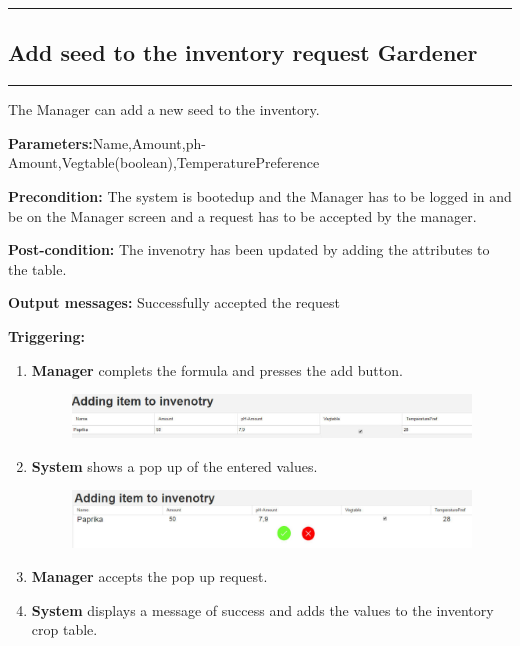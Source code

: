 \hfill
\vspace{0.5cm}
\hrule

\break

\subsection{Add seed to the inventory request Gardener}

\hrule
\hfill
\vspace{0.5cm}

\label{operation:Add a diffrent seed request Gardener}

The Manager can add a new seed to the inventory.
\begin{description}
\item
\textbf{Parameters:}Name,Amount,ph-Amount,Vegtable(boolean),TemperaturePreference
\item \textbf{Precondition:} The system is bootedup and the Manager has to be
logged in and be on the Manager screen and a request has to be accepted by the
manager.
\item \textbf{Post-condition:} The invenotry has been updated by adding the
attributes to the table.
\item 
\item \item \textbf{Output messages:} Successfully accepted the request
\item \textbf{Triggering:}
\begin{enumerate}
\item \textbf{Manager} complets the formula and presses the add button.
\begin{figure}[H]
\includegraphics[width=1\textwidth]{images/AddingSeedToTheInventoryManager.eps}
\end{figure}
\item \textbf{System} shows a pop up of the entered values.
\begin{figure}[H]
\includegraphics[width=1\textwidth]{images/AddingSeedToTheInventoryPopUp.eps}
\end{figure}
\item \textbf{Manager} accepts the pop up request.
\item \textbf{System} displays a message of success and adds the values to the
inventory crop table.

\end{enumerate}
\end{description}

